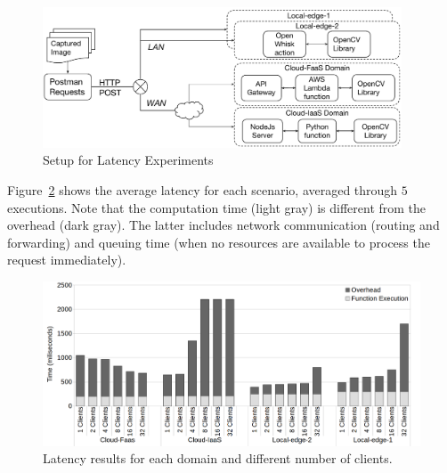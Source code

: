 


 



\begin{figure}[htb]
	
	\centering
	\includegraphics[width=0.95\textwidth]{figs/experimental-setup.pdf}
	\caption{Setup for Latency Experiments}
	\label{fig:exp-setup1}
\end{figure}


 Figure~\ref{fig:latency-domains} shows the average latency for each scenario, averaged through $5$ executions. Note that the computation time (light gray) is different from the overhead (dark gray). The latter includes network communication (routing and forwarding) and queuing time (when no resources are available to process the request immediately). 

\begin{figure}
	
	\centering
	\includegraphics[width=1\textwidth]{figs/latency-domains}
	\caption{Latency results for each domain and different number of clients.}
	\label{fig:latency-domains}
\end{figure}

